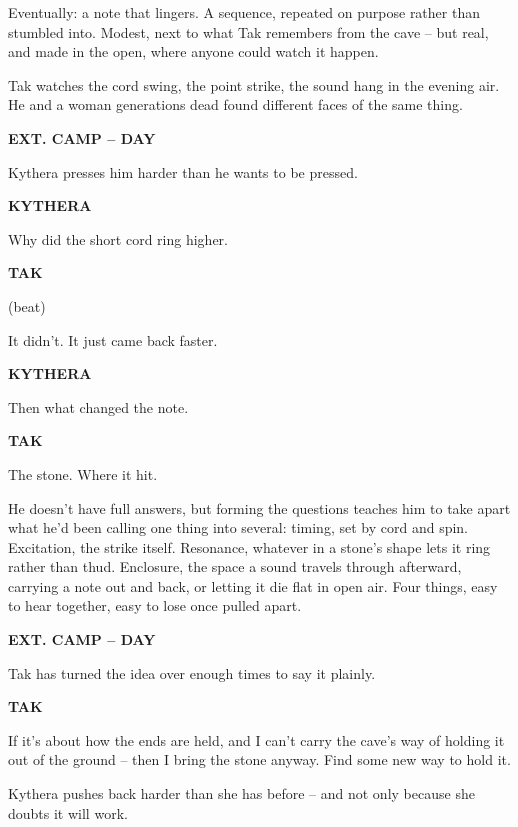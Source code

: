 \documentclass[12pt]{article}
\newcommand{\sceneheading}[1]{%
  \bigskip\noindent\textbf{#1}\par\smallskip
}
\newcommand{\action}[1]{%
  \noindent #1\par\medskip
}
\newcommand{\charcue}[1]{%
  \par\hspace*{2.2in}\textbf{#1}\par
}
\newenvironment{dialogue}{%
  \begin{list}{}{\leftmargin=1.5in\rightmargin=2in\itemsep=0pt\parsep=0pt\topsep=0pt}
  \item[]
}{%
  \end{list}\medskip
}
\newcommand{\parenthetical}[1]{%
  \hspace*{1.9in}(#1)\par
}
\begin{document}
\action{Eventually: a note that lingers. A sequence, repeated on purpose rather than stumbled into. Modest, next to what Tak remembers from the cave -- but real, and made in the open, where anyone could watch it happen.}

\action{Tak watches the cord swing, the point strike, the sound hang in the evening air. He and a woman generations dead found different faces of the same thing.}

\sceneheading{EXT. CAMP -- DAY}

\action{Kythera presses him harder than he wants to be pressed.}

\charcue{KYTHERA}
\begin{dialogue}
Why did the short cord ring higher.
\end{dialogue}

\charcue{TAK}
\begin{dialogue}
\parenthetical{beat}
It didn't. It just came back faster.
\end{dialogue}

\charcue{KYTHERA}
\begin{dialogue}
Then what changed the note.
\end{dialogue}

\charcue{TAK}
\begin{dialogue}
The stone. Where it hit.
\end{dialogue}

\action{He doesn't have full answers, but forming the questions teaches him to take apart what he'd been calling one thing into several: timing, set by cord and spin. Excitation, the strike itself. Resonance, whatever in a stone's shape lets it ring rather than thud. Enclosure, the space a sound travels through afterward, carrying a note out and back, or letting it die flat in open air. Four things, easy to hear together, easy to lose once pulled apart.}

\sceneheading{EXT. CAMP -- DAY}

\action{Tak has turned the idea over enough times to say it plainly.}

\charcue{TAK}
\begin{dialogue}
If it's about how the ends are held, and I can't carry the cave's way of holding it out of the ground -- then I bring the stone anyway. Find some new way to hold it.
\end{dialogue}

\action{Kythera pushes back harder than she has before -- and not only because she doubts it will work.}
\end{document}
